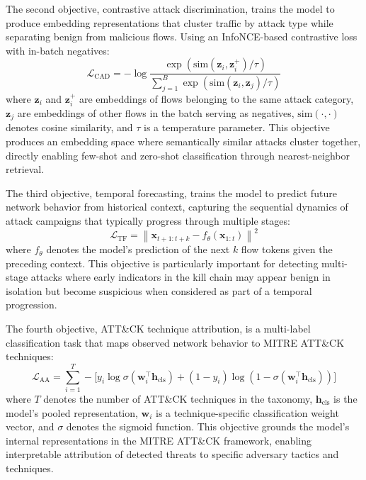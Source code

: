 \documentclass[journal]{IEEEtran}
\newcommand{\norm}[1]{\left\|#1\right\|}
\begin{document}
The second objective, contrastive attack discrimination, trains the model to produce embedding representations that cluster traffic by attack type while separating benign from malicious flows. Using an InfoNCE-based contrastive loss with in-batch negatives:
\begin{equation}
\mathcal{L}_{\text{CAD}} = -\log \frac{\exp(\text{sim}(\mathbf{z}_i, \mathbf{z}_i^+) / \tau)}{\sum_{j=1}^{B} \exp(\text{sim}(\mathbf{z}_i, \mathbf{z}_j) / \tau)}
\label{eq:cad_loss}
\end{equation}
where $\mathbf{z}_i$ and $\mathbf{z}_i^+$ are embeddings of flows belonging to the same attack category, $\mathbf{z}_j$ are embeddings of other flows in the batch serving as negatives, $\text{sim}(\cdot, \cdot)$ denotes cosine similarity, and $\tau$ is a temperature parameter. This objective produces an embedding space where semantically similar attacks cluster together, directly enabling few-shot and zero-shot classification through nearest-neighbor retrieval.

The third objective, temporal forecasting, trains the model to predict future network behavior from historical context, capturing the sequential dynamics of attack campaigns that typically progress through multiple stages:
\begin{equation}
\mathcal{L}_{\text{TF}} = \norm{\mathbf{x}_{t+1:t+k} - f_{\theta}(\mathbf{x}_{1:t})}^2
\label{eq:tf_loss}
\end{equation}
where $f_{\theta}$ denotes the model's prediction of the next $k$ flow tokens given the preceding context. This objective is particularly important for detecting multi-stage attacks where early indicators in the kill chain may appear benign in isolation but become suspicious when considered as part of a temporal progression.

The fourth objective, ATT\&CK technique attribution, is a multi-label classification task that maps observed network behavior to MITRE ATT\&CK techniques:
\begin{equation}
\mathcal{L}_{\text{AA}} = \sum_{i=1}^{T} -\bigl[y_i \log \sigma(\mathbf{w}_i^{\top} \mathbf{h}_{\text{cls}}) + (1 - y_i) \log(1 - \sigma(\mathbf{w}_i^{\top} \mathbf{h}_{\text{cls}}))\bigr]
\label{eq:aa_loss}
\end{equation}
where $T$ denotes the number of ATT\&CK techniques in the taxonomy, $\mathbf{h}_{\text{cls}}$ is the model's pooled representation, $\mathbf{w}_i$ is a technique-specific classification weight vector, and $\sigma$ denotes the sigmoid function. This objective grounds the model's internal representations in the MITRE ATT\&CK framework, enabling interpretable attribution of detected threats to specific adversary tactics and techniques.
\end{document}
